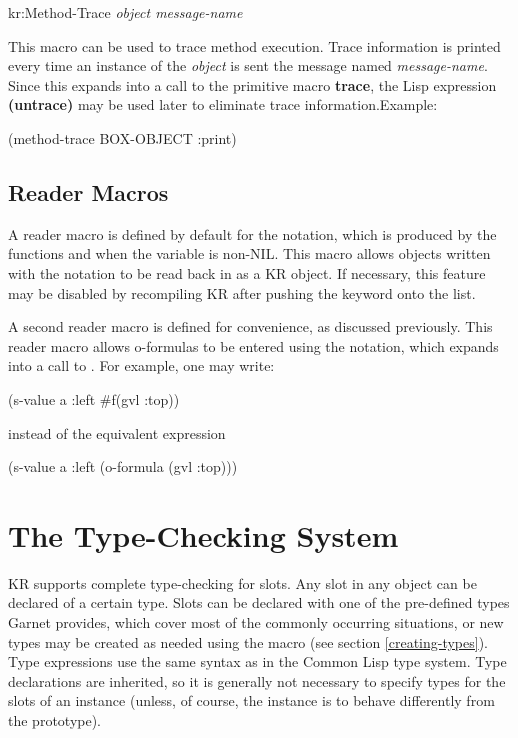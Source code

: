 \value{f-top}
\begin{example}
kr:Method-Trace {\it object message-name}\value{macro}
\end{example}

This macro can be used to trace method execution.  Trace information
is printed every time an instance of the {\it object} is sent the message
named {\it message-name}.  Since this expands into a call to the
primitive macro {\bf trace}, the Lisp expression {\bf (untrace)} may
be used later to eliminate trace information.\newline{}Example:
\begin{programexample}
(method-trace BOX-OBJECT :print)
\end{programexample}


\section{Reader Macros}

A reader macro is defined by default for the  notation, which is
produced by the functions  and  when the variable
 is non-NIL.  This macro allows objects written
with the  notation to be read back in as a KR object.
If necessary, this feature may be disabled by recompiling KR after
pushing the keyword  onto the  list.

A second reader macro is defined for convenience, as discussed previously.
This reader macro
allows o-formulas to be entered using the  notation, which expands
into a call to .  For example, one may write:
\begin{programexample}
   (s-value a :left \#f(gvl :top))
\end{programexample}
instead of the equivalent expression
\begin{programexample}
   (s-value a :left (o-formula (gvl :top)))
\end{programexample}



\chapter{The Type-Checking System}
\label{type-system}

KR supports complete type-checking for slots.  Any
slot in any object can be declared of a certain type.  Slots can
be declared with one of the pre-defined types Garnet provides, which
cover most of the commonly occurring situations, or new types may be
created as needed using the macro  (see section
\ref{creating-types}).  Type
expressions use the same syntax as in the Common Lisp type system.
Type declarations are inherited, so it is generally not necessary to
specify types for the slots of an instance (unless, of course, the
instance is to behave differently from the prototype).


